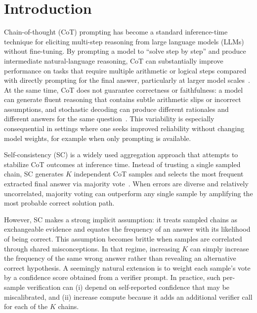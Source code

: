 \documentclass[journal,article,accept,pdftex,moreauthors]{Definitions/mdpi}
\begin{document}
\section{Introduction}

Chain-of-thought (CoT) prompting has become a standard inference-time technique for eliciting multi-step reasoning from large language models (LLMs) without fine-tuning. By prompting a model to ``solve step by step'' and produce intermediate natural-language reasoning, CoT can substantially improve performance on tasks that require multiple arithmetic or logical steps compared with directly prompting for the final answer, particularly at larger model scales~\cite{wei-2022-chain}. At the same time, CoT does not guarantee correctness or faithfulness: a model can generate fluent reasoning that contains subtle arithmetic slips or incorrect assumptions, and stochastic decoding can produce different rationales and different answers for the same question~\cite{wei-2022-chain}. This variability is especially consequential in settings where one seeks improved reliability without changing model weights, for example when only prompting is available.

Self-consistency (SC) is a widely used aggregation approach that attempts to stabilize CoT outcomes at inference time. Instead of trusting a single sampled chain, SC generates $K$ independent CoT samples and selects the most frequent extracted final answer via majority vote~\cite{das-2022-self}. When errors are diverse and relatively uncorrelated, majority voting can outperform any single sample by amplifying the most probable correct solution path.

However, SC makes a strong implicit assumption: it treats sampled chains as exchangeable evidence and equates the frequency of an answer with its likelihood of being correct. This assumption becomes brittle when samples are correlated through shared misconceptions. In that regime, increasing $K$ can simply increase the frequency of the same wrong answer rather than revealing an alternative correct hypothesis. A seemingly natural extension is to weight each sample's vote by a confidence score obtained from a verifier prompt. In practice, such per-sample verification can (i) depend on self-reported confidence that may be miscalibrated, and (ii) increase compute because it adds an additional verifier call for each of the $K$ chains.
\end{document}
